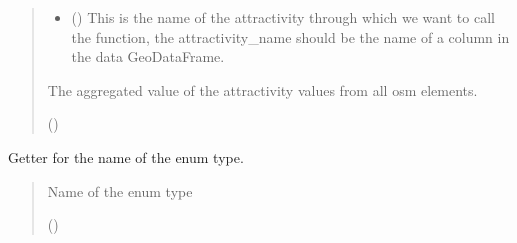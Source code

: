 \documentclass[letterpaper,10pt,english]{sphinxmanual}
\begin{document}
\begin{fulllineitems}
\begin{fulllineitems}
\begin{quote}
\begin{description}
\begin{itemize}
\item {} 
\sphinxAtStartPar
{} () \textendash{} This is the name of the attractivity through which we want to call the function,
the attractivity\_name should be the name of a column in the data GeoDataFrame.

\end{itemize}

\sphinxAtStartPar
The aggregated value of the attractivity values from all osm elements.

\sphinxAtStartPar
()

\end{description}\end{quote}

\end{fulllineitems}


\begin{fulllineitems}
\label{\detokenize{apidoc/src.osm_configurator.model.project.calculation:src.osm_configurator.model.project.calculation.aggregation_method_enum.AggregationMethod.get_name}}
\pysigstartsignatures
{}
\pysigstopsignatures
\sphinxAtStartPar
Getter for the name of the enum type.
\begin{quote}\begin{description}
\sphinxAtStartPar
Name of the enum type

\sphinxAtStartPar
()

\end{description}\end{quote}

\end{fulllineitems}


\end{fulllineitems}
\end{document}
